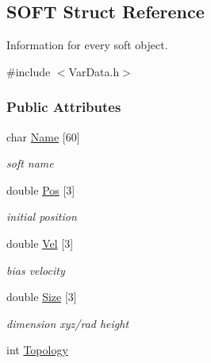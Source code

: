 \hypertarget{structSOFT}{\subsection{\-S\-O\-F\-T \-Struct \-Reference}
\label{structSOFT}
}


\-Information for every soft object.  




{\ttfamily \#include $<$\-Var\-Data.\-h$>$}

\subsubsection*{\-Public \-Attributes}
\begin{DoxyCompactItemize}
\item 
\hypertarget{structSOFT_a7b413349ba4d10cbeb9b09be7c471c9e}{char \hyperlink{structSOFT_a7b413349ba4d10cbeb9b09be7c471c9e}{\-Name} \mbox{[}60\mbox{]}}\label{structSOFT_a7b413349ba4d10cbeb9b09be7c471c9e}

\begin{DoxyCompactList}\small\item\em soft name \end{DoxyCompactList}\item 
\hypertarget{structSOFT_a863738e46f14b3bfc674ad87d35f143d}{double \hyperlink{structSOFT_a863738e46f14b3bfc674ad87d35f143d}{\-Pos} \mbox{[}3\mbox{]}}\label{structSOFT_a863738e46f14b3bfc674ad87d35f143d}

\begin{DoxyCompactList}\small\item\em initial position \end{DoxyCompactList}\item 
\hypertarget{structSOFT_ae3fae9edc78d8cadc33c5a52bebdb46c}{double \hyperlink{structSOFT_ae3fae9edc78d8cadc33c5a52bebdb46c}{\-Vel} \mbox{[}3\mbox{]}}\label{structSOFT_ae3fae9edc78d8cadc33c5a52bebdb46c}

\begin{DoxyCompactList}\small\item\em bias velocity \end{DoxyCompactList}\item 
\hypertarget{structSOFT_a6197f6ec9e15464f34e391fbcfdf0de7}{double \hyperlink{structSOFT_a6197f6ec9e15464f34e391fbcfdf0de7}{\-Size} \mbox{[}3\mbox{]}}\label{structSOFT_a6197f6ec9e15464f34e391fbcfdf0de7}

\begin{DoxyCompactList}\small\item\em dimension xyz/rad height \end{DoxyCompactList}\item 
\hypertarget{structSOFT_a4bbe69a9433b158d68d6b011d0e20ea4}{int \hyperlink{structSOFT_a4bbe69a9433b158d68d6b011d0e20ea4}{\-Topology}}\label{structSOFT_a4bbe69a9433b158d68d6b011d0e20ea4}


\end{DoxyCompactItemize}
